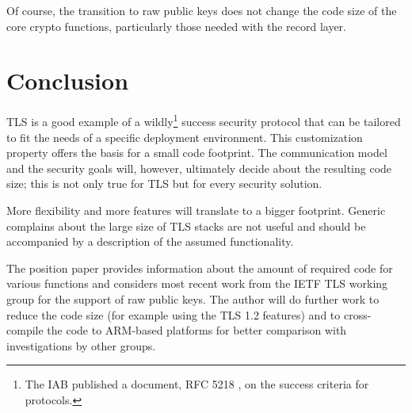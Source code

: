 \documentclass[a4paper, 10pt]{IEEEtran}
\begin{document}
Of course, the transition to raw public keys does not change the code size of the core crypto functions, particularly those needed with the record layer. 

\section{Conclusion}
TLS is a good example of a wildly\footnote{The IAB published a document, RFC 5218 \cite{rfc5218}, on the success criteria for protocols.} success security protocol that can be tailored to fit the needs of a specific deployment environment. This customization property offers the basis for a small code footprint. The communication model and the security goals will, however, ultimately decide about the resulting code size; this is not only true for TLS but for every security solution. 

More flexibility and more features will translate to a bigger footprint. Generic complains about the large size of TLS stacks are not useful and should be accompanied by a description of the assumed functionality.  

The position paper provides information about the amount of required code for various functions and considers most recent work from the IETF TLS working group for the support of raw public keys. The author will do further work to reduce the code size (for example using the TLS 1.2 features) and to cross-compile the code to ARM-based platforms for better comparison with investigations by other groups.


% 

\end{document}

